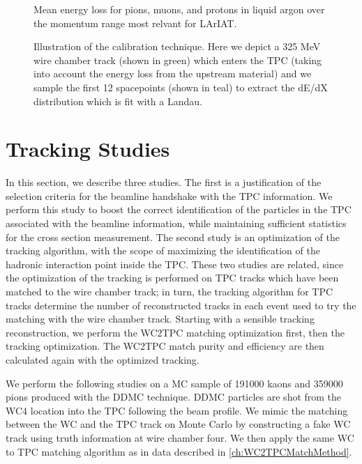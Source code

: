 \begin{figure}[htb]
\centering
\caption{Mean energy loss for pions, muons, and protons in liquid argon over the momentum range most relvant for LArIAT.}
\label{fig:PDGEnergyLossArgon}
\end{figure}




\begin{figure}[htb]
\centering
\caption{Illustration of the calibration technique. Here we depict a 325 MeV wire chamber track (shown in green) which enters the TPC (taking into account the energy loss from the upstream material) and we sample the first 12 spacepoints (shown in teal) to extract the dE/dX distribution which is fit with a Landau.}
\label{fig:CalibrationExample}
\end{figure}









\section{Tracking Studies}
In this section, we describe three studies. The first is a justification of the selection criteria for the beamline handshake with the TPC information.  We perform this study to boost  the correct identification of the particles in the TPC associated with the beamline information, while maintaining sufficient statistics for the cross section measurement. 
The second study is an optimization of the tracking algorithm, with the scope of maximizing the identification of the hadronic interaction point inside the TPC. These two studies are related, since the optimization of the tracking is performed on TPC tracks which have been matched to the wire chamber track; in turn, the tracking algorithm for TPC tracks determine the number of reconstructed tracks in each event used to try the matching with the wire chamber track. Starting with a sensible tracking reconstruction, we perform the WC2TPC matching optimization first, then the tracking optimization. The WC2TPC match purity and efficiency  are then calculated again with the optimized tracking.


We perform the following studies on a MC sample of 191000 kaons and 359000 pions produced with the DDMC technique. DDMC particles are shot from the WC4 location into the TPC following the beam profile.
We mimic the matching between the WC and the TPC track on Monte Carlo by constructing a fake WC track using truth information at wire chamber four. We then apply the same WC to TPC matching algorithm as in data described in \ref{ch:WC2TPCMatchMethod}. 



